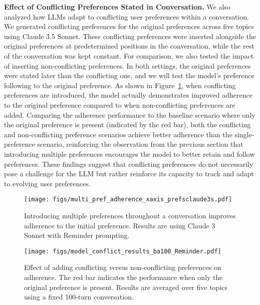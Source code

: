 \textbf{Effect of Conflicting Preferences Stated in Conversation.} We also analyzed how LLMs adapt to conflicting user preferences within a conversation. We generated conflicting preferences for the original preferences across five topics using Claude 3.5 Sonnet. These conflicting preferences were inserted alongside the original preferences at predetermined positions in the conversation, while the rest of the conversation was kept constant. For comparison, we also tested the impact of inserting non-conflicting preferences. In both settings, the original preferences were stated later than the conflicting one, and we will test the model's preference following to the original preference. As shown in Figure~\ref{fig:conflict}, when conflicting preferences are introduced, the model actually demonstrates improved adherence to the original preference compared to when non-conflicting preferences are added. Comparing the adherence performance to the baseline scenario where only the original preference is present (indicated by the red bar), both the conflicting and non-conflicting preference scenarios achieve better adherence than the single-preference scenario, reinforcing the observation from the previous section that introducing multiple preferences encourages the model to better retain and follow preferences. These findings suggest that conflicting preferences do not necessarily pose a challenge for the LLM but rather reinforce its capacity to track and adapt to evolving user preferences. 
\begin{figure}[t]
\centering
    \begin{minipage}{0.48\textwidth}
    \centering
         \texttt{[image: figs/multi\_pref\_adherence\_xaxis\_prefsclaude3s.pdf]}
\caption{Introducing multiple preferences throughout a conversation improves adherence to the initial preference. Results are using Claude 3 Sonnet with Reminder prompting.}

\label{fig:multiple_prefs}
    \end{minipage}
     \hspace{0.01\textwidth}
\begin{minipage}{0.48\textwidth}
    \texttt{[image: figs/model\_conflict\_results\_ba100\_Reminder.pdf]}
\caption{Effect of adding conflicting versus non-conflicting preferences on adherence. The red bar indicates the performance when only the original preference is present. Results are averaged over five topics using a fixed 100-turn conversation.}
\label{fig:conflict}
\end{minipage}
\end{figure}

